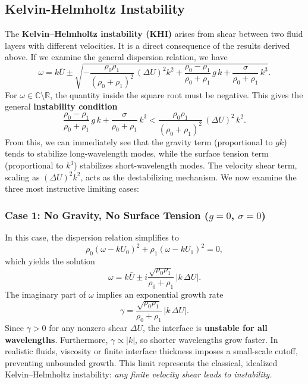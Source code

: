 \subsection{Kelvin-Helmholtz Instability}
\label{sec:kelvin_helmholtz}

The \textbf{Kelvin--Helmholtz instability (KHI)} arises from shear between two fluid layers with different velocities. 
It is a direct consequence of the results derived above. If we examine the general dispersion relation, we have
\begin{equation}
\omega = k \bar{U} 
\pm 
\sqrt{
-\frac{\rho_0 \rho_1}{(\rho_0 + \rho_1)^2}\,(\Delta U)^2 k^2
+ \frac{\rho_0 - \rho_1}{\rho_0 + \rho_1}\,g\,k
+ \frac{\sigma}{\rho_0 + \rho_1}\,k^3 }.
\end{equation}
For $\omega \in \mathbb{C}\setminus \mathbb{R}$, the quantity inside the square root must be negative. 
This gives the general \textbf{instability condition}
\begin{equation}
\label{eq:kh_instability_condition}
\frac{\rho_0 - \rho_1}{\rho_0 + \rho_1}\,g\,k + \frac{\sigma}{\rho_0 + \rho_1}\,k^3 
< \frac{\rho_0 \rho_1}{(\rho_0 + \rho_1)^2}\,(\Delta U)^2\,k^2.
\end{equation}
From this, we can immediately see that the gravity term (proportional to $gk$) tends to stabilize long-wavelength modes, 
while the surface tension term (proportional to $k^3$) stabilizes short-wavelength modes.  
The velocity shear term, scaling as $(\Delta U)^2 k^2$, acts as the destabilizing mechanism.  
We now examine the three most instructive limiting cases:

\subsubsection*{Case 1: No Gravity, No Surface Tension ($g = 0$, $\sigma = 0$)}

In this case, the dispersion relation simplifies to
\begin{equation}
\rho_0 (\omega - k U_0)^2 + \rho_1 (\omega - k U_1)^2 = 0,
\end{equation}
which yields the solution
\begin{equation}
\omega = k \bar{U} \pm i \frac{\sqrt{\rho_0 \rho_1}}{\rho_0 + \rho_1}\,|k\,\Delta U|.
\end{equation}
The imaginary part of $\omega$ implies an exponential growth rate
\begin{equation}
\gamma = \frac{\sqrt{\rho_0 \rho_1}}{\rho_0 + \rho_1}\,|k\,\Delta U|.
\end{equation}
Since $\gamma > 0$ for any nonzero shear $\Delta U$, the interface is \textbf{unstable for all wavelengths}.  
Furthermore, $\gamma \propto |k|$, so shorter wavelengths grow faster.  
In realistic fluids, viscosity or finite interface thickness imposes a small-scale cutoff, preventing unbounded growth.  
This limit represents the classical, idealized Kelvin--Helmholtz instability:  
\textit{any finite velocity shear leads to instability.}


